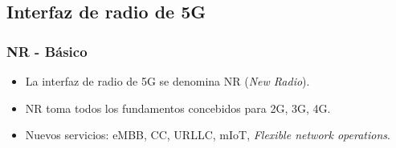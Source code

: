 \documentclass{beamer}
\begin{document}
\subsection{Interfaz de radio de 5G}

\begin{frame}
\frametitle{NR - Básico}

\begin{itemize}
\item La interfaz de radio de 5G se denomina NR (\textit{New Radio}).
\item NR toma todos los fundamentos concebidos para 2G, 3G, 4G.
\item Nuevos servicios:  eMBB, CC, URLLC, mIoT, \textit{Flexible network operations}.
\end{itemize}
\end{frame}
\end{document}
